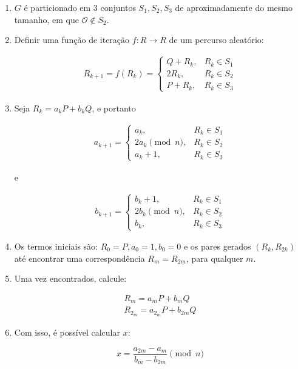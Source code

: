 \begin{enumerate}
\item \(G\) é particionado em 3 conjuntos $S_1, S_2, S_3$ de aproximadamente do mesmo tamanho, em que $\mathcal{O} \notin S_2$.
\item Definir uma função de iteração $f : R \to R$ de um percurso aleatório:

\begin{eqnarray} \label{eq:walk}
R_{k+1} = f(R_k) =
\begin{cases}
Q + R_k, &R_k \in S_1 \\
2R_k, &R_k \in S_2 \\
P + R_k, &R_k \in S_3
\end{cases}
\end{eqnarray}

\item Seja $R_k = a_kP + b_kQ$, e portanto

\begin{eqnarray}
a_{k+1} =
\begin{cases}
a_k, &R_k \in S_1 \\
2a_k \pmod n, &R_k \in S_2 \\
a_k + 1, &R_k \in S_3
\end{cases}
\end{eqnarray}

e

\begin{eqnarray}
b_{k+1} =
\begin{cases}
b_k + 1, &R_k \in S_1 \\
2b_k \pmod n, &R_k \in S_2 \\
b_k, &R_k \in S_3
\end{cases}
\end{eqnarray}

\item Os termos iniciais são: $R_0 = P, a_0 = 1, b_0 = 0$ e os pares gerados $(R_k, R_{2k})$ até encontrar uma correspondência $R_m = R_{2m}$, para qualquer \(m\).

\item Uma vez encontrados, calcule:

\begin{eqnarray*}
R_m = a_mP + b_mQ \\
R_{2_m} = a_{2_m}P + b_{2m}Q
\end{eqnarray*}

\item Com isso, é possível calcular \(x\):

\begin{equation} \label{eq:x}
x = \frac{a_{2m} - a_m}{b_m - b_{2m}} \pmod n
\end{equation}

\end{enumerate}

